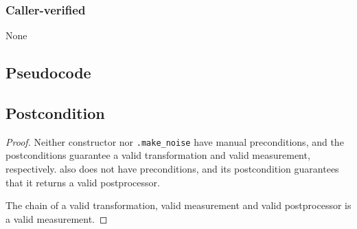 \documentclass{article}
\begin{document}
\subsubsection*{Caller-verified}
None

\subsection*{Pseudocode}


\subsection*{Postcondition}
\begin{theorem}
\end{theorem}

\begin{proof}
    Neither constructor  nor
    \texttt{.make\_noise} have manual preconditions,
    and the postconditions guarantee a valid transformation and valid measurement, respectively.
     also does not have preconditions,
    and its postcondition guarantees that it returns a valid postprocessor.

    The chain of a valid transformation, valid measurement and valid postprocessor is a valid measurement.
\end{proof}
\end{document}
